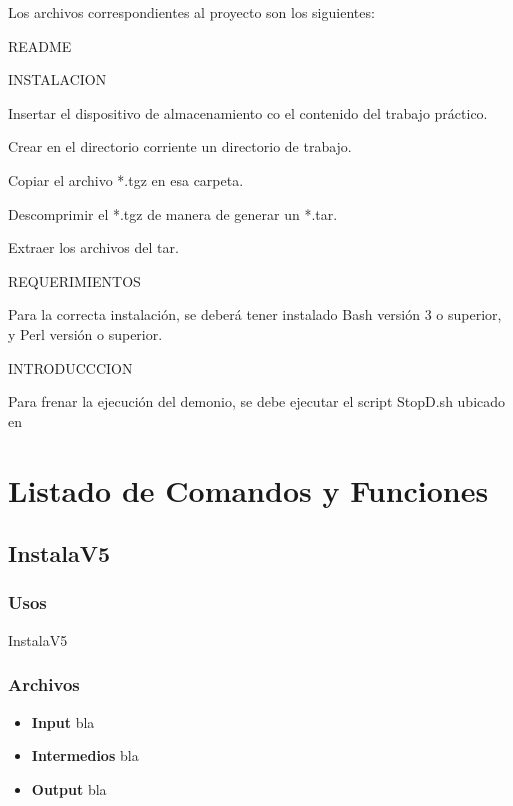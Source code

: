 \documentclass[a4paper,10pt,titlepage]{article}
\begin{document}
Los archivos correspondientes al proyecto son los siguientes:

README

INSTALACION

Insertar el dispositivo de almacenamiento co el contenido del trabajo práctico.

Crear en el directorio corriente un directorio de trabajo.

Copiar el archivo *.tgz en esa carpeta.

Descomprimir el *.tgz de manera de generar un *.tar.

Extraer los archivos del tar.


REQUERIMIENTOS

Para la correcta instalación, se deberá tener instalado Bash versión 3 o superior, y Perl versión  o superior.


INTRODUCCCION



Para frenar la ejecución del demonio, se debe ejecutar el script StopD.sh ubicado en %




\newpage

\section{Listado de Comandos y Funciones}

	\subsection{InstalaV5}
		\subsubsection{Usos}
			 InstalaV5

		\subsubsection{Archivos}
			\begin {itemize}
				\item \textbf{Input} {bla}
				\item \textbf{Intermedios} {bla}
				\item \textbf{Output} {bla}
			\end{itemize}
\end{document}
